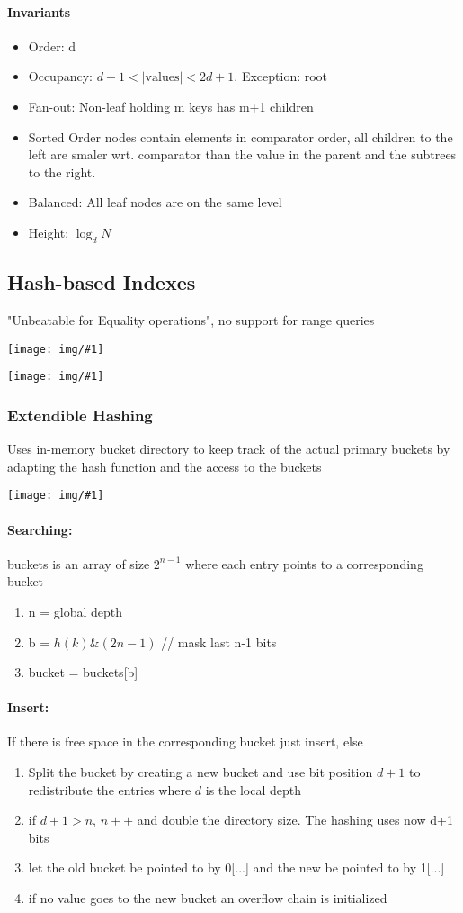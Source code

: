 \documentclass[a4paper]{article}
\newcommand{\img}[1]{\begin{center}
    \texttt{[image: img/\#1]}
\end{center} }
\begin{document}
\begin{twocolumn}
\paragraph{Invariants}
\begin{itemize}
	\item Order: d
	\item Occupancy: $d-1 < |\text{values}| < 2d+1$. Exception: root
	\item Fan-out: Non-leaf holding m keys has m+1 children
	\item Sorted Order nodes contain elements in comparator order, all children to the left are smaler wrt. comparator than the value in the parent and the subtrees to the right.
	\item Balanced: All leaf nodes are on the same level
	\item Height: $\log_d N$
\end{itemize}

\subsection{Hash-based Indexes}
"Unbeatable for Equality operations", no support for range queries
\img{hash_fn.png}
\img{hash_family.png}
 \subsubsection{Extendible Hashing}
Uses in-memory bucket directory to keep track of the actual primary buckets by adapting the hash function and the access to the buckets

\img{extendible_hashing.png}

\paragraph{Searching:} buckets is an array of size $2^{n-1}$ where each entry points to a corresponding bucket
\begin{enumerate}
	\item n = global depth
	\item b = $h(k) \& (2n-1)$ // mask last n-1 bits
	\item bucket = buckets[b]
\end{enumerate}

\paragraph{Insert:} If there is free space in the corresponding bucket just insert, else 
\begin{enumerate}
	\item Split the bucket by creating a new bucket and use bit position $d+1$ to redistribute the entries where $d$ is the local depth
	\item if $d+1 > n$, $n++$ and double the directory size. The hashing uses now d+1 bits
	\item let the old bucket be pointed to by 0[...] and the new be pointed to by 1[...]
	\item if no value goes to the new bucket an overflow chain is initialized
\end{enumerate}


\end{twocolumn}
\end{document}

